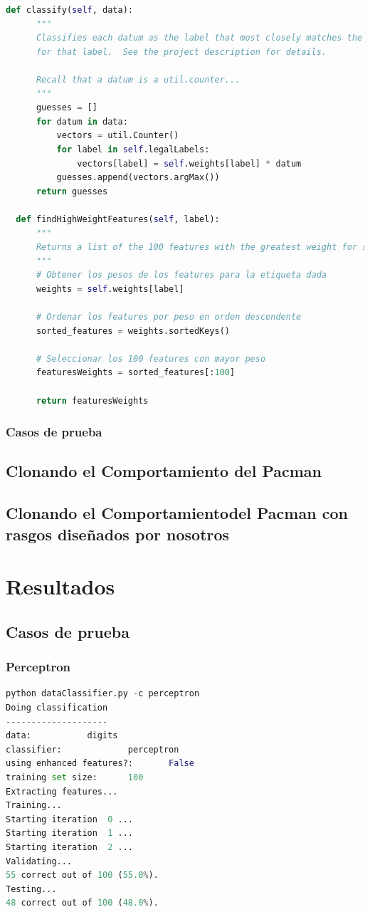 \documentclass{report}
\begin{document}
\begin{lstlisting}[language=Python, caption=Implementación final del perceptron]
  def classify(self, data):
      """
      Classifies each datum as the label that most closely matches the prototype vector
      for that label.  See the project description for details.

      Recall that a datum is a util.counter...
      """
      guesses = []
      for datum in data:
          vectors = util.Counter()
          for label in self.legalLabels:
              vectors[label] = self.weights[label] * datum
          guesses.append(vectors.argMax())
      return guesses

  def findHighWeightFeatures(self, label):
      """
      Returns a list of the 100 features with the greatest weight for some label
      """
      # Obtener los pesos de los features para la etiqueta dada
      weights = self.weights[label]

      # Ordenar los features por peso en orden descendente
      sorted_features = weights.sortedKeys()

      # Seleccionar los 100 features con mayor peso
      featuresWeights = sorted_features[:100]

      return featuresWeights

          \end{lstlisting}
        \subsection{Casos de prueba}
      \section{Clonando el Comportamiento del Pacman}
      \section{Clonando el Comportamientodel Pacman con rasgos diseñados por nosotros}
    \chapter{Resultados}
      \section{Casos de prueba}
        \subsection{Perceptron}
          \begin{lstlisting}[language=Python, caption=Ejecución del perceptron]
python dataClassifier.py -c perceptron
Doing classification
--------------------
data:           digits
classifier:             perceptron
using enhanced features?:       False
training set size:      100
Extracting features...
Training...
Starting iteration  0 ...
Starting iteration  1 ...
Starting iteration  2 ...
Validating...
55 correct out of 100 (55.0%).
Testing...
48 correct out of 100 (48.0%).            
          \end{lstlisting}
\end{document}
